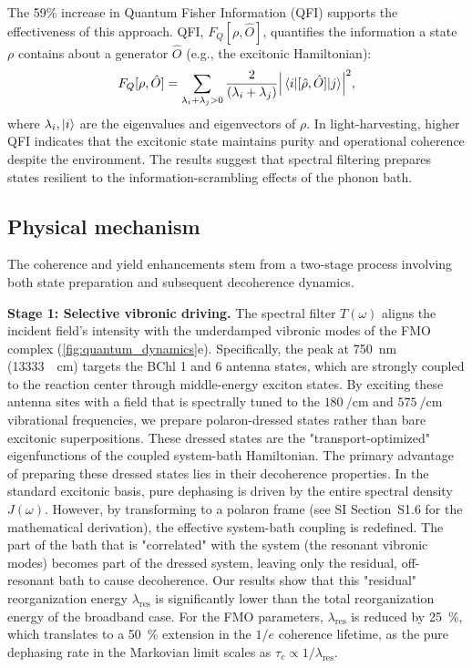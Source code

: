 \documentclass[journal=jpcl,manuscript=letter]{achemso}
\begin{document}
The 59\% increase in Quantum Fisher Information (QFI) supports the effectiveness of this approach. QFI, $F_Q[\rho, \hat{O}]$, quantifies the information a state $\rho$ contains about a generator $\hat{O}$ (e.g., the excitonic Hamiltonian):
\begin{equation}
F_Q[\rho, \hat{O}] = \sum_{\lambda_i + \lambda_j > 0} \frac{2}{(\lambda_i + \lambda_j)} \abs{\mel{i}{[\hat{\rho}, \hat{O}]}{j}}^2,
\label{eq:QFI}
\end{equation}
where $\lambda_i, \ket{i}$ are the eigenvalues and eigenvectors of $\rho$. In light-harvesting, higher QFI indicates that the excitonic state maintains purity and operational coherence despite the environment.\cite{Pezze2009} The results suggest that spectral filtering prepares states resilient to the information-scrambling effects of the phonon bath.

\subsection*{Physical mechanism}

The coherence and yield enhancements stem from a two-stage process involving both state preparation and subsequent decoherence dynamics. 

\textbf{Stage 1: Selective vibronic driving.} The spectral filter $T(\omega)$ aligns the incident field's intensity with the underdamped vibronic modes of the FMO complex (\cref{fig:quantum_dynamics}e). Specifically, the peak at \SI{750}{\nano\meter} (\SI{13333}{\per\centi\meter}) targets the BChl 1 and 6 antenna states, which are strongly coupled to the reaction center through middle-energy exciton states. By exciting these antenna sites with a field that is spectrally tuned to the $\SI{180}{\per\centi\meter}$ and $\SI{575}{\per\centi\meter}$ vibrational frequencies, we prepare polaron-dressed states rather than bare excitonic superpositions. These dressed states are the "transport-optimized" eigenfunctions of the coupled system-bath Hamiltonian.\cite{Chin2013} The primary advantage of preparing these dressed states lies in their decoherence properties. In the standard excitonic basis, pure dephasing is driven by the entire spectral density $J(\omega)$. However, by transforming to a polaron frame (see SI Section~S1.6 for the mathematical derivation), the effective system-bath coupling is redefined. The part of the bath that is "correlated" with the system (the resonant vibronic modes) becomes part of the dressed system, leaving only the residual, off-resonant bath to cause decoherence. Our results show that this "residual" reorganization energy $\lambda_{\mathrm{res}}$ is significantly lower than the total reorganization energy of the broadband case. For the FMO parameters, $\lambda_{\mathrm{res}}$ is reduced by \SI{25}{\percent}, which translates to a \SI{50}{\percent} extension in the $1/e$ coherence lifetime, as the pure dephasing rate in the Markovian limit scales as $\tau_c \propto 1/\lambda_{\mathrm{res}}$.
\end{document}
